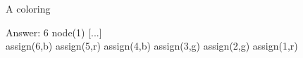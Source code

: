 
\begin{frame}[fragile]{A coloring}
\footnotesize
\begin{semiverbatim}
Answer: 6
node(1)   [...]    \\
\alert{assign(6,b) assign(5,r) assign(4,b) assign(3,g) assign(2,g) assign(1,r)}
\end{semiverbatim}
\pause
\medskip
\begin{center}

\end{center}
\end{frame}

%
